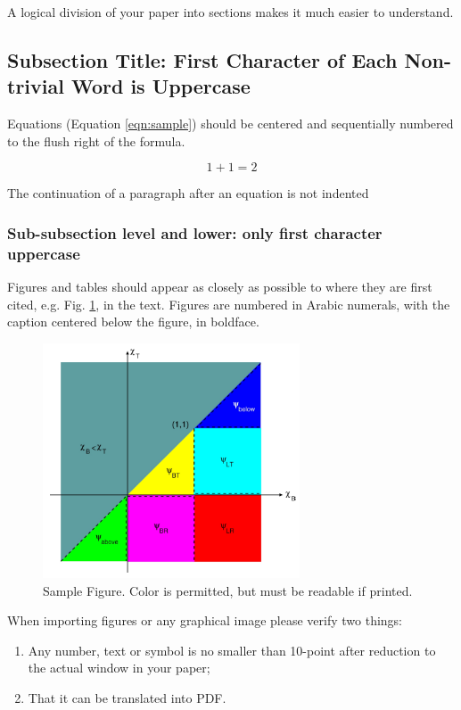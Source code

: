 \documentclass{mc2015}
\begin{document}
A logical division of your paper into sections makes it much easier to understand.    

\subsection{Subsection Title: First Character of Each Non-trivial Word is Uppercase}

Equations (Equation \ref{eqn:sample}) should be centered and sequentially numbered to the flush right of the formula.

\begin{equation}
  1+1=2
  \label{eqn:sample}
\end{equation}

\noindent
The continuation of a paragraph after an equation is not indented

\subsubsection{Sub-subsection level and lower: only first character uppercase}

Figures and tables should appear as closely as possible to where they are first cited, e.g. 
Fig. \ref{fig:sample}, in the text.  Figures are numbered in Arabic numerals, with the caption centered below the figure, in boldface. 

\begin{figure}[H]
  \centering
  \includegraphics[width=3in]{figure.png}
  \caption{Sample Figure. Color is permitted, but must be readable if printed.}
  \label{fig:sample}
\end{figure}

When importing figures or any graphical image please verify two things:
\begin{enumerate}
\item Any number, text or symbol is no smaller than 10-point after reduction to the actual window in your paper;
\item That it can be translated into PDF.
\end{enumerate}
\end{document}
